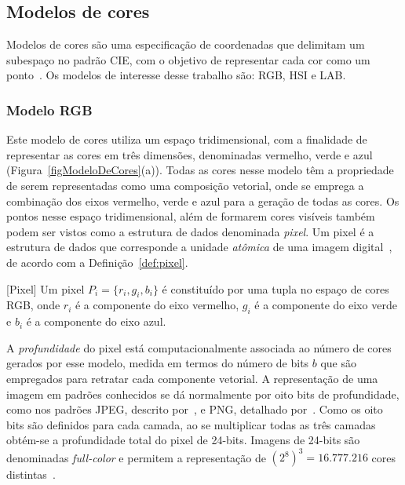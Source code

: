 \subsection{Modelos de cores}

Modelos de cores são uma especificação de coordenadas que delimitam um subespaço no padrão CIE, com o objetivo de representar cada cor como um ponto~\cite{Sonka1993}.
Os modelos de interesse desse trabalho são: RGB, HSI e LAB.

\subsubsection{Modelo RGB}

Este modelo de cores utiliza um espaço tridimensional, com a finalidade de representar as cores em três dimensões, denominadas vermelho, verde e azul (Figura~\ref{figModeloDeCores}(a)). 
Todas as cores nesse modelo têm a propriedade de serem representadas como uma composição vetorial, onde se emprega a combinação dos eixos vermelho, verde e azul para a geração de todas as cores. 
Os pontos nesse espaço tridimensional, além de formarem cores visíveis também podem ser vistos como a estrutura de dados denominada \textit{pixel}.
Um pixel é a estrutura de dados que corresponde a unidade \textit{atômica} de uma imagem digital~\cite{mccamy1976,Sonka1993}, de acordo com a Definição~\ref{def:pixel}.

\begin{definition}\label{def:pixel}[Pixel] 
Um pixel $P_i=\{r_i,g_i,b_i\} $ é constituído por uma tupla no espaço de cores RGB, onde $r_i$ é a componente do eixo vermelho, $g_i$ é a componente do eixo verde e $b_i$ é a componente do eixo azul.
\end{definition}

A \textit{profundidade} do pixel está computacionalmente associada ao número de cores gerados por esse modelo, medida em termos do número de bits $b$ que são empregados para retratar cada componente vetorial. 
A representação de uma imagem em padrões conhecidos se dá normalmente por oito bits de profundidade, como nos padrões JPEG, descrito por~, e PNG, detalhado por~.
Como os oito bits são definidos para cada camada, ao se multiplicar todas as três camadas obtém-se a profundidade total do pixel de 24-bits.
Imagens de 24-bits são denominadas \textit{full-color} e permitem a representação de $(2^8)^3 = 16.777.216$ cores distintas~\cite{Chang1996,Gonzalez2008}.  

